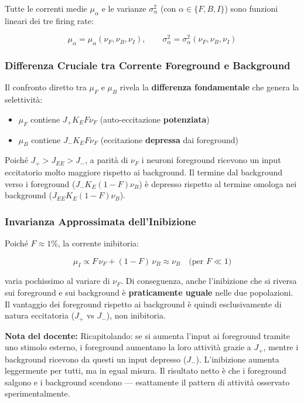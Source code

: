 Tutte le correnti medie $\mu_\alpha$ e le varianze $\sigma^2_\alpha$ (con $\alpha \in \{F, B, I\}$) sono funzioni lineari dei tre firing rate:

\begin{equation}
\mu_\alpha = \mu_\alpha(\nu_F, \nu_B, \nu_I), \qquad \sigma^2_\alpha = \sigma^2_\alpha(\nu_F, \nu_B, \nu_I)
\end{equation}

\subsubsection{Differenza Cruciale tra Corrente Foreground e Background}

Il confronto diretto tra $\mu_F$ e $\mu_B$ rivela la \textbf{differenza fondamentale} che genera la selettività:

\begin{itemize}
    \item $\mu_F$ contiene $J_+ K_E F \nu_F$ (auto-eccitazione \textbf{potenziata})
    \item $\mu_B$ contiene $J_- K_E F \nu_F$ (eccitazione \textbf{depressa} dai foreground)
\end{itemize}

Poiché $J_+ > J_{EE} > J_-$, a parità di $\nu_F$ i neuroni foreground ricevono un input eccitatorio molto maggiore rispetto ai background. Il termine dal background verso i foreground ($J_- K_E(1-F)\nu_B$) è depresso rispetto al termine omologa nei background ($J_{EE}K_E(1-F)\nu_B$).

\subsubsection{Invarianza Approssimata dell'Inibizione}

Poiché $F \approx 1\%$, la corrente inibitoria:

\begin{equation}
\mu_I \propto F\,\nu_F + (1-F)\,\nu_B \approx \nu_B \quad \text{(per } F \ll 1\text{)}
\end{equation}

varia pochissimo al variare di $\nu_F$. Di conseguenza, anche l'inibizione che si riversa sui foreground e sui background è \textbf{praticamente uguale} nelle due popolazioni. Il vantaggio dei foreground rispetto ai background è quindi esclusivamente di natura eccitatoria ($J_+$ vs $J_-$), non inibitoria.

\begin{tcolorbox}[colback=gray!5, colframe=gray!40, arc=2mm, boxrule=0.5pt]
\textbf{Nota del docente:} Ricapitolando: se si aumenta l'input ai foreground tramite uno stimolo esterno, i foreground aumentano la loro attività grazie a $J_+$, mentre i background ricevono da questi un input depresso ($J_-$). L'inibizione aumenta leggermente per tutti, ma in egual misura. Il risultato netto è che i foreground salgono e i background scendono — esattamente il pattern di attività osservato sperimentalmente.
\end{tcolorbox}


